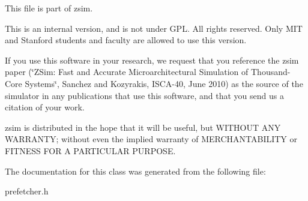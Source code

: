 This file is part of zsim.

This is an internal version, and is not under G\-P\-L. All rights reserved. Only M\-I\-T and Stanford students and faculty are allowed to use this version.

If you use this software in your research, we request that you reference the zsim paper (\char`\"{}\-Z\-Sim\-: Fast and Accurate Microarchitectural Simulation of
\-Thousand-\/\-Core Systems\char`\"{}, Sanchez and Kozyrakis, I\-S\-C\-A-\/40, June 2010) as the source of the simulator in any publications that use this software, and that you send us a citation of your work.

zsim is distributed in the hope that it will be useful, but W\-I\-T\-H\-O\-U\-T A\-N\-Y W\-A\-R\-R\-A\-N\-T\-Y; without even the implied warranty of M\-E\-R\-C\-H\-A\-N\-T\-A\-B\-I\-L\-I\-T\-Y or F\-I\-T\-N\-E\-S\-S F\-O\-R A P\-A\-R\-T\-I\-C\-U\-L\-A\-R P\-U\-R\-P\-O\-S\-E. 

The documentation for this class was generated from the following file\-:\begin{DoxyCompactItemize}
\item 
prefetcher.\-h\end{DoxyCompactItemize}
